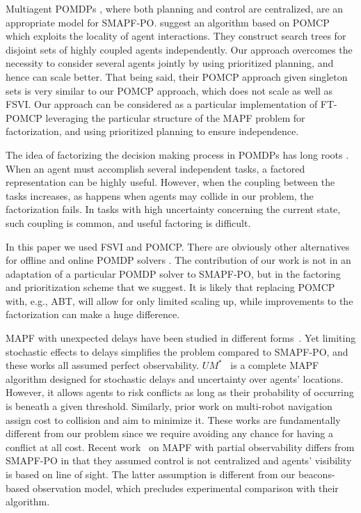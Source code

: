 \documentclass[letterpaper]{article} %
\begin{document}
Multiagent POMDPs \cite{oliehoek2017madp}, where both planning and control are centralized, are an appropriate model for SMAPF-PO.  \citet{amato2015scalable} suggest an algorithm based on POMCP which exploits the locality of agent interactions. They construct search trees for disjoint sets of highly coupled agents independently. Our approach overcomes the necessity to consider several agents jointly by using prioritized planning, and hence can scale better. That being said, their POMCP approach given singleton sets is very similar to our POMCP approach, which does not scale as well as FSVI. Our approach can be considered as a particular implementation of FT-POMCP leveraging the particular structure of the MAPF problem for factorization, and using prioritized planning to ensure independence.

The idea of factorizing the decision making process in POMDPs has long roots \cite[e.g.]{shani2008efficient,veiga2014point}. When an agent must accomplish several independent tasks, a factored representation can be highly useful. However, when the coupling between the tasks increases, as happens when agents may collide in our problem, the factorization fails. In tasks with high uncertainty concerning the current state, such coupling is common, and useful factoring is difficult.

In this paper we used FSVI and POMCP. There are obviously other alternatives for offline and online POMDP solvers \cite[e.g.]{walraven2019point,kurniawati2016online,ye2017despot}. The contribution of our work is not in an adaptation of a particular POMDP solver to SMAPF-PO, but in the factoring and prioritization scheme that we suggest. It is likely that replacing POMCP with, e.g., ABT, will allow for only limited scaling up, while improvements to the factorization can make a huge difference.


MAPF with unexpected delays have been studied in different forms~\cite{atzmon2020probabilistic,shahar2021safe,atzmon2020robust,ma2017multiAgent}. Yet limiting stochastic effects to delays simplifies the problem compared to SMAPF-PO, and these works all assumed perfect observability. 
$UM^*$~\cite{wagner2017path} is a complete MAPF algorithm designed for stochastic delays and uncertainty over agents' locations. However, it allows agents to risk conflicts as long as their probability of occurring is beneath a given threshold. 
Similarly, prior work on multi-robot navigation assign cost to collision and aim to minimize it. 
These works are fundamentally different from our problem since we require avoiding any chance for having a conflict at all cost. 
Recent work~\cite{davydov2021q} on MAPF with partial observability differs from SMAPF-PO in that they assumed control is not centralized and agents' visibility is based on line of sight. The latter assumption is different from our beacons-based observation model, which precludes experimental comparison with their algorithm. 
\end{document}
